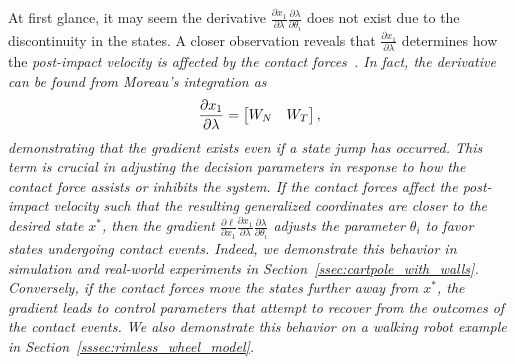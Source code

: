 %
At first glance, it may seem the derivative $\frac{\partial x_1}{\partial
\lambda}\frac{\partial \lambda}{\partial \theta_i}$ does not exist due to
the discontinuity in the states. 
%
A closer observation reveals that  $\frac{\partial x_1}{\partial \lambda}$
determines how the \it{post-impact velocity is affected by the
contact forces}~\normalfont.
%
In fact, the derivative can be found from Moreau's integration as 
\begin{align*}
    \frac{\partial x_1}{\partial \lambda} = \begin{bmatrix}W_N & W_T \end{bmatrix}, 
\end{align*}
%
demonstrating that the gradient exists even if a state jump has occurred. 
%
This term is crucial in adjusting the decision parameters in response to how the
contact force assists or inhibits the system.
%
If the contact forces affect the \it{post-impact} \normalfont velocity such that
the resulting generalized coordinates are closer to the desired state $x^*$,
then the gradient $\frac{\partial \ell}{\partial x_1} \frac{\partial
x_1}{\partial \lambda}\frac{\partial \lambda}{\partial \theta_i}$ adjusts the
parameter $\theta_i$ to favor states undergoing contact events. 
%
Indeed, we demonstrate this behavior in simulation and real-world experiments in
Section~\ref{ssec:cartpole_with_walls}.
%
Conversely, if the contact forces move the states further away from $x^*$, the
gradient leads to control parameters that attempt to recover from the outcomes
of the contact events.
%
We also demonstrate this behavior on a walking robot example in
Section~\ref{sssec:rimless_wheel_model}.
